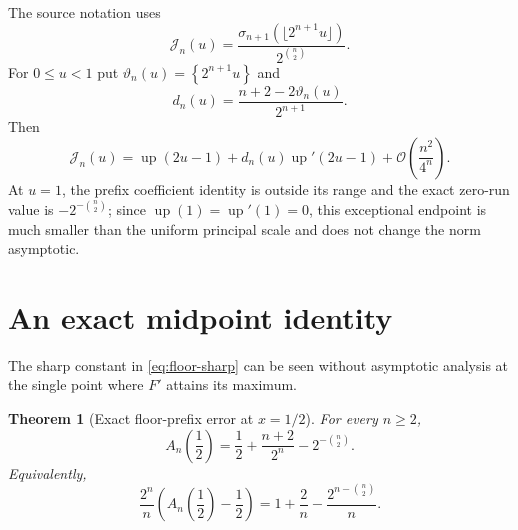 \documentclass[11pt,oneside]{article}
\newtheorem{theorem}{Theorem}[section]
\theoremstyle{definition}
\theoremstyle{remark}
\newcommand{\Up}{\operatorname{up}}
\newcommand{\bigO}{\mathcal O}
\newcommand{\fract}[1]{\left\{#1\right\}}
\begin{document}
The source notation uses
\begin{equation}
 \mathcal J_n(u)
 =\frac{\sigma_{n+1}(\lfloor2^{n+1}u\rfloor)}{2^{\binom n2}}.
\end{equation}
For $0\le u<1$ put $\vartheta_n(u)=\fract{2^{n+1}u}$ and
\begin{equation}
 d_n(u)=\frac{n+2-2\vartheta_n(u)}{2^{n+1}}.
\end{equation}
Then
\begin{equation}
 \mathcal J_n(u)
 =\Up(2u-1)+d_n(u)\Up'(2u-1)
  +\bigO\!\left(\frac{n^2}{4^n}\right).                  \label{eq:J-expansion}
\end{equation}
At $u=1$, the prefix coefficient identity is outside its range and the exact zero-run value is
$-2^{-\binom n2}$; since $\Up(1)=\Up'(1)=0$, this exceptional endpoint is much smaller than
the uniform principal scale and does not change the norm asymptotic.

\section{An exact midpoint identity}
\label{sec:midpoint}

The sharp constant in \eqref{eq:floor-sharp} can be seen without asymptotic analysis at the
single point where $F'$ attains its maximum.

\begin{theorem}[Exact floor-prefix error at $x=1/2$]
\label{thm:midpoint-exact}
For every $n\ge2$,
\begin{equation}
 A_n\!\left(\frac12\right)
 =\frac12+\frac{n+2}{2^n}-2^{-\binom n2}.                 \label{eq:midpoint-exact}
\end{equation}
Equivalently,
\begin{equation}
 \frac{2^n}{n}
 \left(A_n\!\left(\frac12\right)-\frac12\right)
 =1+\frac2n-\frac{2^{n-\binom n2}}n.                     \label{eq:midpoint-scaled}
\end{equation}
\end{theorem}
\end{document}
